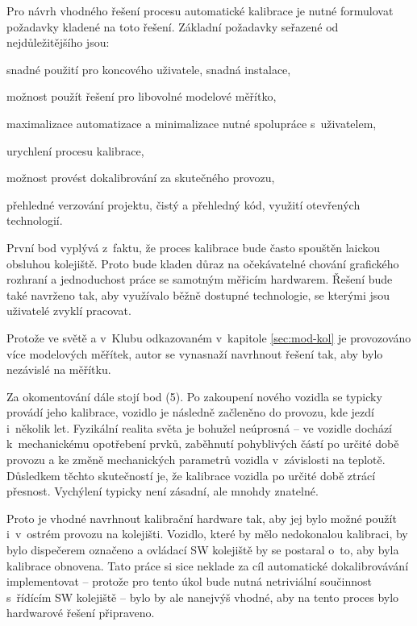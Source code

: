 Pro návrh vhodného řešení procesu automatické kalibrace je nutné formulovat
požadavky kladené na toto řešení. Základní požadavky seřazené od
nejdůležitějšího jsou:

\begin{compactenum}
	\item snadné použití pro koncového uživatele, snadná instalace,
	\item možnost použít řešení pro libovolné modelové měřítko,
	\item maximalizace automatizace a minimalizace nutné spolupráce s~uživatelem,
	\item urychlení procesu kalibrace,
	\item možnost provést dokalibrování za skutečného provozu,
	\item přehledné verzování projektu, čistý a přehledný kód, využití otevřených
	technologií.
\end{compactenum}

První bod vyplývá z~faktu, že proces kalibrace bude často spouštěn laickou obsluhou
kolejiště. Proto bude kladen důraz na očekávatelné chování grafického
rozhraní a jednoduchost práce se samotným měřicím hardwarem. Řešení bude také
navrženo tak, aby využívalo běžně dostupné technologie, se kterými jsou
uživatelé zvyklí pracovat.

Protože ve světě a v~Klubu odkazovaném v~kapitole \ref{sec:mod-kol} je
provozováno více modelových měřítek, autor se vynasnaží navrhnout řešení tak,
aby bylo nezávislé na měřítku.

Za okomentování dále stojí bod (5). Po zakoupení nového vozidla se
typicky provádí jeho kalibrace, vozidlo je následně začleněno do provozu, kde
jezdí i~několik let. Fyzikální realita světa je bohužel neúprosná --
ve vozidle dochází k~mechanickému opotřebení prvků, zaběhnutí pohyblivých
částí po určité době provozu a ke změně mechanických parametrů vozidla
v~závislosti na teplotě. Důsledkem těchto skutečností je, že kalibrace vozidla
po určité době ztrácí přesnost. Vychýlení typicky není zásadní, ale mnohdy
znatelné.

Proto je vhodné navrhnout kalibrační hardware tak, aby jej bylo možné použít
i~v~ostrém provozu na kolejišti. Vozidlo, které by mělo nedokonalou kalibraci,
by bylo dispečerem označeno a ovládací SW kolejiště by se postaral o~to, aby byla
kalibrace obnovena. Tato práce si sice neklade za cíl automatické
dokalibrovávání implementovat -- protože pro tento úkol bude nutná netriviální
součinnost s~řídícím SW kolejiště -- bylo by ale nanejvýš vhodné, aby na tento
proces bylo hardwarové řešení připraveno.

